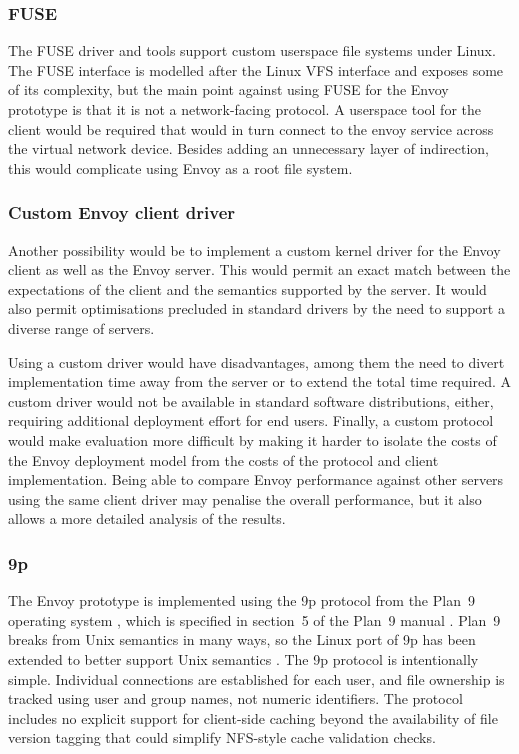 \subsubsection{FUSE}

The FUSE driver and tools support custom userspace file systems under Linux. The FUSE interface is modelled after the Linux VFS interface and exposes some of its complexity, but the main point against using FUSE for the Envoy prototype is that it is not a network-facing protocol. A userspace tool for the client would be required that would in turn connect to the envoy service across the virtual network device. Besides adding an unnecessary layer of indirection, this would complicate using Envoy as a root file system.

\subsubsection{Custom Envoy client driver}

Another possibility would be to implement a custom kernel driver for the Envoy client as well as the Envoy server. This would permit an exact match between the expectations of the client and the semantics supported by the server. It would also permit optimisations precluded in standard drivers by the need to support a diverse range of servers.

Using a custom driver would have disadvantages, among them the need to divert implementation time away from the server or to extend the total time required. A custom driver would not be available in standard software distributions, either, requiring additional deployment effort for end users. Finally, a custom protocol would make evaluation more difficult by making it harder to isolate the costs of the Envoy deployment model from the costs of the protocol and client implementation. Being able to compare Envoy performance against other servers using the same client driver may penalise the overall performance, but it also allows a more detailed analysis of the results.

\subsubsection{9p}

The Envoy prototype is implemented using the 9p protocol from the Plan~9 operating system \cite{pike90,pike92}, which is specified in section~5 of the Plan~9 manual \cite{9man}. Plan~9 breaks from Unix semantics in many ways, so the Linux port of 9p has been extended to better support Unix semantics \cite{hensbergen}. The 9p protocol is intentionally simple. Individual connections are established for each user, and file ownership is tracked using user and group names, not numeric identifiers. The protocol includes no explicit support for client-side caching beyond the availability of file version tagging that could simplify NFS-style cache validation checks.

